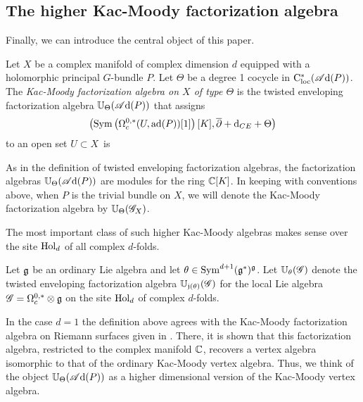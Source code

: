 \documentclass[10pt]{amsart}
\def\sAd{\sA{\rm d}}
\begin{document}

\subsection{The higher Kac-Moody factorization algebra}

Finally, we can introduce the central object of this paper.

\begin{dfn}
Let $X$ be a complex manifold of complex dimension $d$ equipped with a holomorphic principal $G$-bundle $P$.
Let $\Theta$ be a degree 1 cocycle in $\cloc^*(\sAd(P))$. 
The {\em Kac-Moody factorization algebra on $X$ of type $\Theta$} is the twisted enveloping factorization algebra $\UU_\Theta (\sAd(P))$ that assigns
\[
\left({\rm Sym}\left(\Omega^{0,*}_c(U, {\rm ad}(P))[1]\right) [K] , \overline{\partial} + {\rm d}_{CE} + \Theta\right) 
\]
to an open set $U \subset X$~is
\end{dfn}

\begin{rmk} 
As in the definition of twisted enveloping factorization algebras, the factorization algebras $\UU_\Theta(\sAd(P))$ are modules for the ring $\mathbb C[K]$. 
In keeping with conventions above, when $P$ is the trivial bundle on $X$, 
we will denote the Kac-Moody factorization algebra by $\mathbb U_\Theta(\mathscr G_X)$. 
\end{rmk}

The most important class of such higher Kac-Moody algebras makes sense over the site ${\rm Hol}_d$ of all complex $d$-folds.

\begin{dfn}
Let $\mathfrak g$ be an ordinary Lie algebra and let $\theta \in {\rm Sym}^{d+1}(\mathfrak g^*)^\mathfrak g$.  
Let $\mathbb U_\theta (\mathscr G)$ denote the twisted enveloping factorization algebra $\mathbb U_{\mathfrak j(\theta)} (\mathscr G)$ for the local Lie algebra $\mathscr G = \Omega^{0,*}_c \otimes \mathfrak g$ on the site ${\rm Hol}_d$ of complex $d$-folds.
\end{dfn}

In the case $d = 1$ the definition above agrees with the Kac-Moody factorization algebra on Riemann surfaces given in \cite{CG1}.
There, it is shown that this factorization algebra, restricted to the complex manifold $\mathbb C$, recovers a vertex algebra isomorphic to that of the ordinary Kac-Moody vertex algebra.
Thus, we think of the object $\UU_\Theta(\sAd(P))$ as a higher dimensional version of the Kac-Moody vertex algebra.
\end{document}
